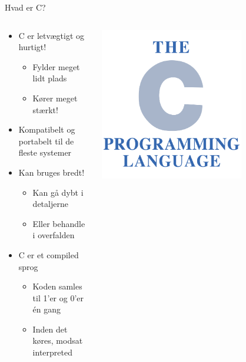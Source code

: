 \documentclass{beamer}
\begin{document}
\begin{frame}{Hvad er C?}
	\begin{columns}
	
		\begin{column}{0.5\textwidth}
		\begin{itemize}
		\item {C er letvægtigt og hurtigt!}
			\begin{itemize}
			\item{Fylder meget lidt plads}
			\item{Kører meget stærkt!}
			\end{itemize}
		\item {Kompatibelt og portabelt til de fleste systemer}
		\item {Kan bruges bredt!}
			\begin{itemize}
			\item {Kan gå dybt i detaljerne}
			\item {Eller behandle i overfalden}
			\end{itemize}
		\item{C er et compiled sprog}
			\begin{itemize}
			\item {Koden samles til 1'er og 0'er én gang}
			\item {Inden det køres, modsat interpreted}
			\end{itemize}
		\end{itemize}
		\end{column}
		
		\begin{column}{0.5\textwidth}
		\begin{center}
     		\includegraphics[width=0.7\textwidth]{assets/The_C_Programming_Language_logo.png}
     	\end{center}
		\end{column}
		
	\end{columns}
\end{frame}
\end{document}
